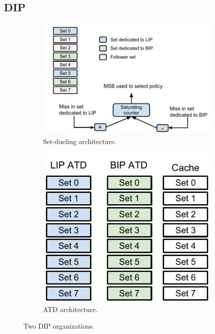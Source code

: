 \subsection{DIP}
\label{sec:algorithms:dip}

\begin{figure}
    \centering
    \begin{subfigure}[b]{0.50\textwidth}
        \includegraphics[width=\textwidth]{figures/algorithms/DIP_architecture}
        \caption{Set-dueling architecture.}
        \label{fig:algorithms:dip:set_dueling}
    \end{subfigure}    
    \begin{subfigure}[b]{0.45\textwidth}
        \includegraphics[width=.9\textwidth]{figures/algorithms/DIP_atd_architecture}
        \caption{ATD architecture.}
        \label{fig:algorithms:dip:atd}
    \end{subfigure}
    \caption{Two DIP organizations.}
\end{figure}

